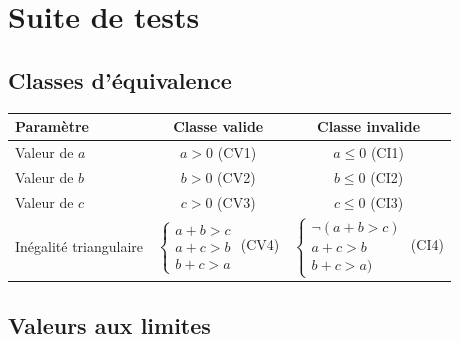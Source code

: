 \documentclass[a4paper,11pt]{article}
\begin{document}
\section{Suite de tests}

\label{tests}

\subsection{Classes d'équivalence}

\begin{center}
\begin{tabular}{|l|c|c|}
\hline
\bf Paramètre & \bf Classe valide & \bf Classe invalide\\
\hline
\hline
Valeur de $a$ & $a > 0$ (CV1) & $a \leq 0$ (CI1)\\
\hline
Valeur de $b$ & $b > 0$ (CV2) & $b \leq 0$ (CI2)\\
\hline
Valeur de $c$ & $c > 0$ (CV3) & $c \leq 0$ (CI3)\\
\hline
Inégalité triangulaire & $\begin{cases}a+b > c\\a+c > b\\b+c > a\end{cases}$ (CV4) & $\begin{cases}\neg(a+b > c)\\a+c > b\\b+c > a)\end{cases}$ (CI4)\\
\hline
\end{tabular}
\end{center}

\subsection{Valeurs aux limites}

\label{limits}
\end{document}
